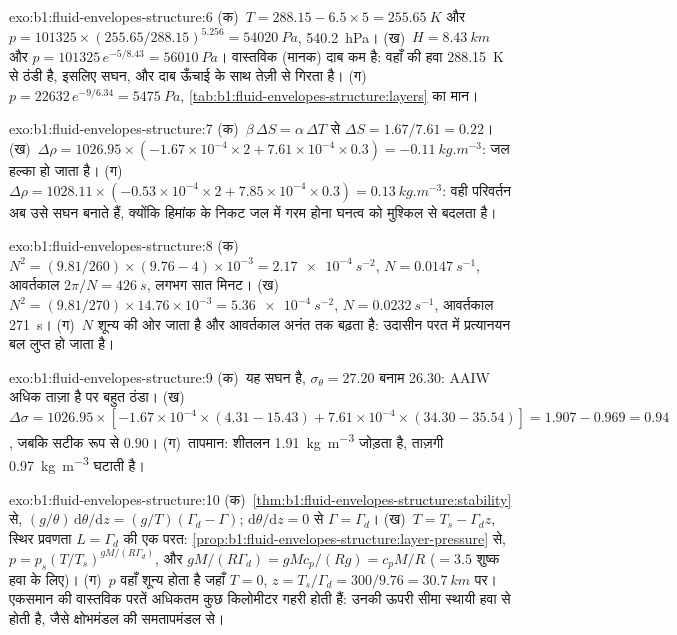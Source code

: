 \begin{solution}{exo:b1:fluid-envelopes-structure:6}
(क)~$T = 288.15 - 6.5 \times 5 = \qty{255.65}{K}$ और $p = \num{101325} \times
(255.65/288.15)^{5.256} = \qty{54020}{Pa}$, \qty{540.2}{hPa}। (ख)~$H =
\qty{8.43}{km}$ और $p = \num{101325}\,e^{-5/8.43} = \qty{56010}{Pa}$। वास्तविक (मानक) दाब कम है: वहाँ की हवा \qty{288.15}{K} से ठंडी है, इसलिए सघन, और दाब ऊँचाई के साथ तेज़ी से गिरता है। (ग)~$p = \num{22632}\,
e^{-9/6.34} = \qty{5475}{Pa}$, \cref{tab:b1:fluid-envelopes-structure:layers} का मान।
\end{solution}

\begin{solution}{exo:b1:fluid-envelopes-structure:7}
(क)~$\beta\,\Delta S = \alpha\,\Delta T$ से $\Delta S = 1.67/7.61 = 0.22$। (ख)~$\Delta\rho = 1026.95 \times (-1.67\times10^{-4} \times 2 + 7.61\times10^{-4}
\times 0.3) = \qty{-0.11}{kg.m^{-3}}$: जल हल्का हो जाता है। (ग)~$\Delta\rho = 1028.11 \times (-0.53\times10^{-4} \times 2 + 7.85\times10^{-4}
\times 0.3) = \qty{+0.13}{kg.m^{-3}}$: वही परिवर्तन अब उसे सघन बनाते हैं, क्योंकि हिमांक के निकट जल में गरम होना घनत्व को मुश्किल से बदलता है।
\end{solution}

\begin{solution}{exo:b1:fluid-envelopes-structure:8}
(क)~$N^2 = (9.81/260) \times (9.76 - 4)\times10^{-3} = \qty{2.17e-4}{s^{-2}}$,
$N = \qty{0.0147}{s^{-1}}$, आवर्तकाल $2\pi/N = \qty{426}{s}$, लगभग सात मिनट। (ख)~$N^2 = (9.81/270) \times 14.76\times10^{-3} = \qty{5.36e-4}{s^{-2}}$,
$N = \qty{0.0232}{s^{-1}}$, आवर्तकाल \qty{271}{s}। (ग)~$N$ शून्य की ओर जाता है और आवर्तकाल अनंत तक बढ़ता है: उदासीन परत में प्रत्यानयन बल लुप्त हो जाता है।
\end{solution}

\begin{solution}{exo:b1:fluid-envelopes-structure:9}
(क)~यह सघन है, $\sigma_\theta = 27.20$ बनाम 26.30: AAIW अधिक ताज़ा है पर बहुत ठंडा। (ख)~$\Delta\sigma = 1026.95 \times [-1.67\times10^{-4} \times
(4.31 - 15.43) + 7.61\times10^{-4} \times (34.30 - 35.54)] = 1.907 - 0.969 =
0.94$, जबकि सटीक रूप से $0.90$। (ग)~तापमान: शीतलन \qty{1.91}{kg.m^{-3}} जोड़ता है, ताज़गी \qty{0.97}{kg.m^{-3}} घटाती है।
\end{solution}

\begin{solution}{exo:b1:fluid-envelopes-structure:10}
(क)~\cref{thm:b1:fluid-envelopes-structure:stability} से, $(g/\theta)\,\mathrm
d\theta/\mathrm dz = (g/T)(\Gamma_d - \Gamma)$; $\mathrm d\theta/\mathrm dz = 0$ से $\Gamma = \Gamma_d$। (ख)~$T = T_s - \Gamma_d z$, स्थिर प्रवणता $L = \Gamma_d$ की एक परत: \cref{prop:b1:fluid-envelopes-structure:layer-pressure} से, $p =
p_s (T/T_s)^{gM/(R\Gamma_d)}$, और $gM/(R\Gamma_d) = gMc_p/(Rg) = c_pM/R$
($= 3.5$ शुष्क हवा के लिए)। (ग)~$p$ वहाँ शून्य होता है जहाँ $T = 0$, $z = T_s/\Gamma_d =
300/9.76 = \qty{30.7}{km}$ पर। एकसमान  की वास्तविक परतें अधिकतम कुछ किलोमीटर गहरी होती हैं: उनकी ऊपरी सीमा स्थायी हवा से होती है, जैसे क्षोभमंडल की समतापमंडल से।
\end{solution}

